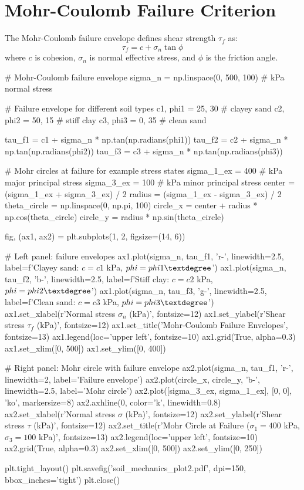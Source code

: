 \documentclass[11pt,a4paper]{article}
\begin{document}
\section{Mohr-Coulomb Failure Criterion}

The Mohr-Coulomb failure envelope defines shear strength $\tau_f$ as:
\begin{equation}
\tau_f = c + \sigma_n \tan\phi
\end{equation}
where $c$ is cohesion, $\sigma_n$ is normal effective stress, and $\phi$ is the friction angle.

\begin{pycode}
# Mohr-Coulomb failure envelope
sigma_n = np.linspace(0, 500, 100)  # kPa normal stress

# Failure envelope for different soil types
c1, phi1 = 25, 30  # clayey sand
c2, phi2 = 50, 15  # stiff clay
c3, phi3 = 0, 35   # clean sand

tau_f1 = c1 + sigma_n * np.tan(np.radians(phi1))
tau_f2 = c2 + sigma_n * np.tan(np.radians(phi2))
tau_f3 = c3 + sigma_n * np.tan(np.radians(phi3))

# Mohr circles at failure for example stress states
sigma_1_ex = 400  # kPa major principal stress
sigma_3_ex = 100  # kPa minor principal stress
center = (sigma_1_ex + sigma_3_ex) / 2
radius = (sigma_1_ex - sigma_3_ex) / 2
theta_circle = np.linspace(0, np.pi, 100)
circle_x = center + radius * np.cos(theta_circle)
circle_y = radius * np.sin(theta_circle)

fig, (ax1, ax2) = plt.subplots(1, 2, figsize=(14, 6))

# Left panel: failure envelopes
ax1.plot(sigma_n, tau_f1, 'r-', linewidth=2.5, label=f'Clayey sand: $c={c1}$ kPa, $\\phi={phi1}°$')
ax1.plot(sigma_n, tau_f2, 'b-', linewidth=2.5, label=f'Stiff clay: $c={c2}$ kPa, $\\phi={phi2}°$')
ax1.plot(sigma_n, tau_f3, 'g-', linewidth=2.5, label=f'Clean sand: $c={c3}$ kPa, $\\phi={phi3}°$')
ax1.set_xlabel(r'Normal stress $\sigma_n$ (kPa)', fontsize=12)
ax1.set_ylabel(r'Shear stress $\tau_f$ (kPa)', fontsize=12)
ax1.set_title('Mohr-Coulomb Failure Envelopes', fontsize=13)
ax1.legend(loc='upper left', fontsize=10)
ax1.grid(True, alpha=0.3)
ax1.set_xlim([0, 500])
ax1.set_ylim([0, 400])

# Right panel: Mohr circle with failure envelope
ax2.plot(sigma_n, tau_f1, 'r-', linewidth=2, label='Failure envelope')
ax2.plot(circle_x, circle_y, 'b-', linewidth=2.5, label='Mohr circle')
ax2.plot([sigma_3_ex, sigma_1_ex], [0, 0], 'ko', markersize=8)
ax2.axhline(0, color='k', linewidth=0.8)
ax2.set_xlabel(r'Normal stress $\sigma$ (kPa)', fontsize=12)
ax2.set_ylabel(r'Shear stress $\tau$ (kPa)', fontsize=12)
ax2.set_title(r'Mohr Circle at Failure ($\sigma_1=400$ kPa, $\sigma_3=100$ kPa)', fontsize=13)
ax2.legend(loc='upper left', fontsize=10)
ax2.grid(True, alpha=0.3)
ax2.set_xlim([0, 500])
ax2.set_ylim([0, 250])

plt.tight_layout()
plt.savefig('soil_mechanics_plot2.pdf', dpi=150, bbox_inches='tight')
plt.close()
\end{pycode}
\end{document}

